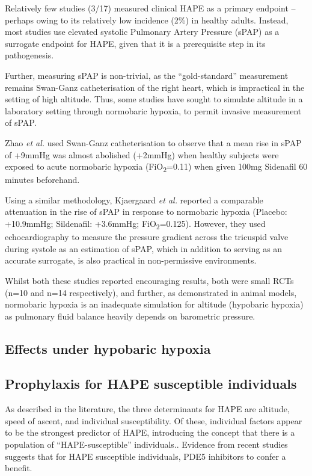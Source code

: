 \documentclass[10pt,a4paper]{article}
\begin{document}
Relatively few studies (3/17) measured clinical HAPE as a primary endpoint -- perhaps owing to its relatively low incidence (2\%) in healthy adults\cite{Bartsch:2002cg}. Instead, most studies use elevated systolic Pulmonary Artery Pressure (sPAP) as a surrogate endpoint for HAPE, given that it is a prerequisite step in its pathogenesis.\cite{Maggiorini:2001vq}

Further, measuring sPAP is non-trivial, as the ``gold-standard'' measurement remains Swan-Ganz catheterisation of the right heart, which is impractical in the setting of high altitude. Thus, some studies have sought to simulate altitude in a laboratory setting through normobaric hypoxia, to permit invasive measurement of sPAP.

Zhao \emph{et al.} used Swan-Ganz catheterisation to observe that a mean rise in sPAP of +9mmHg was almost abolished (+2mmHg) when healthy subjects were exposed to acute normobaric hypoxia (FiO\textsubscript{2}=0.11) when given 100mg Sidenafil 60 minutes beforehand.\cite{Zhao:2001kj}

Using a similar methodology, Kjaergaard \emph{et al.} reported a comparable attenuation in the rise of sPAP in response to normobaric hypoxia (Placebo: +10.9mmHg; Sildenafil: +3.6mmHg; FiO\textsubscript{2}=0.125).\cite{Kjaergaard:2007hp} However, they used echocardiography to measure the pressure gradient across the tricuspid valve during systole as an estimation of sPAP, which in addition to serving as an accurate surrogate, is also practical in non-permissive environments.\cite{Tramarin:1991uo,Allemann:2000tc}

Whilst both these studies reported encouraging results, both were small RCTs (n=10 and n=14 respectively), and further, as demonstrated in animal models, normobaric hypoxia is an inadequate simulation for altitude (hypobaric hypoxia) as pulmonary fluid balance heavily depends on barometric pressure.\cite{Bland:1977kz,Levine:1988uq}

\subsection*{Effects under hypobaric hypoxia}


\subsection*{Prophylaxis for HAPE susceptible individuals}

As described in the literature, the three determinants for HAPE are altitude, speed of ascent, and individual susceptibility.\cite{Bartsch:2001kc,Bartsch:2002cg,Dehnert:2005ca} Of these, individual factors appear to be the strongest predictor of HAPE,\cite{Bartsch:2002cg} introducing the concept that there is a population of ``HAPE-susceptible'' individuals.\cite{Bartsch:2001kc,Dehnert:2005ca}. Evidence from recent studies suggests that for HAPE susceptible individuals, PDE5 inhibitors to confer a benefit.
\end{document}

